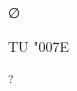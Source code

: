 
\makeatletter
{}%
	{\ProvideDocumentCommand \nul { } {∅}}
	{%
		{\ProvideDocumentCommand \nul { } {{}}}
		{\newcommand{\nul}{\texorpdfstring{{\zerofont 0}}{∅}}}}
\makeatother

\DeclareTextSymbol{\texttilde} {TU} {"007E}

\ProvideDocumentCommand \supq {} {\textsuperscript*{?}}

\usepackage{newunicodechar}

